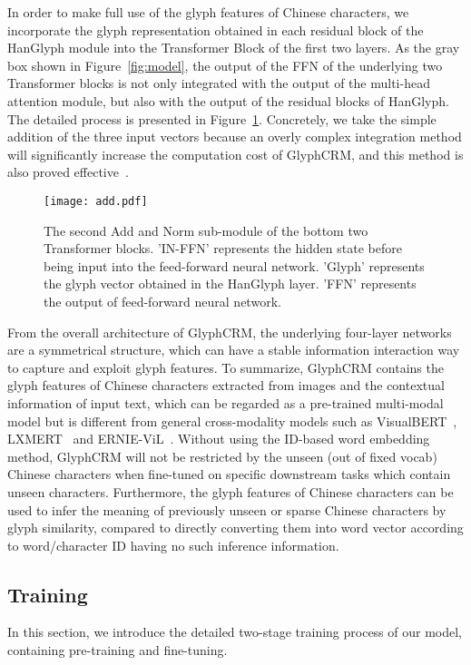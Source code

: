 In order to make full use of the glyph features of Chinese characters, we incorporate the glyph representation obtained in each residual block of the HanGlyph module into the Transformer Block of the first two layers. As the gray box shown in Figure~\ref{fig:model}, the output of the FFN of the underlying two Transformer blocks is not only integrated with the output of the multi-head attention module, but also with the output of the residual blocks of HanGlyph. The detailed process is presented in Figure~\ref{fig:add}. Concretely, we take the simple addition of the three input vectors because an overly complex integration method will significantly increase the computation cost of GlyphCRM, and this method is also proved effective~\cite{resnet}.
\begin{figure}
    \centering
    \texttt{[image: add.pdf]}
    \caption{The second Add and Norm sub-module of the bottom two Transformer blocks. 'IN-FFN' represents the hidden state before being input into the feed-forward neural network. 'Glyph' represents the glyph vector obtained in the HanGlyph layer. 'FFN' represents the output of feed-forward neural network.}
    \label{fig:add}
\end{figure}

From the overall architecture of GlyphCRM, the underlying four-layer networks are a symmetrical structure, which can have a stable information interaction way to capture and exploit glyph features. To summarize, GlyphCRM contains the glyph features of Chinese characters extracted from images and the contextual information of input text, which can be regarded as a pre-trained multi-modal model but is different from general cross-modality models such as VisualBERT~\cite{visualbert}, LXMERT~\cite{tan-bansal-2019-lxmert} and ERNIE-ViL~\cite{ernie_vil}. Without using the ID-based word embedding method, GlyphCRM will not be restricted by the unseen (out of fixed vocab) Chinese characters when fine-tuned on specific downstream tasks which contain unseen characters. Furthermore, the glyph features of Chinese characters can be used to infer the meaning of previously unseen or sparse Chinese characters by glyph similarity, compared to directly converting them into word vector according to word/character ID having no such inference information. 

\subsection{Training}
In this section, we introduce the detailed two-stage training process of our model, containing pre-training and fine-tuning.

